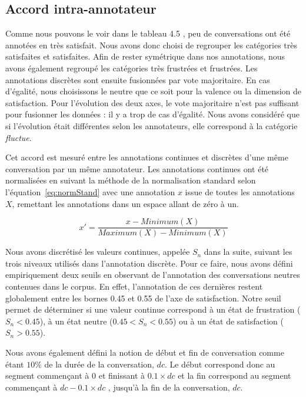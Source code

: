 \subsection{Accord intra-annotateur}
Comme nous pouvons le voir dans le tableau 4.5
, peu de conversations ont été annotées en très satisfait. Nous avons donc choisi de regrouper les catégories très satisfaites et satisfaites. Afin de rester symétrique dans nos annotations, nous avons également regroupé les catégories très frustrées et frustrées. Les annotations discrètes sont ensuite fusionnées par vote majoritaire. En cas d'égalité,
nous choisissons le neutre que ce soit pour la valence ou la dimension de satisfaction. Pour l'évolution des deux axes, le vote majoritaire n'est pas suffisant pour fusionner les données : il y a trop de cas d'égalité. Nous avons considéré que si l'évolution était différentes selon les annotateurs, elle correspond à la catégorie \textit{fluctue}.

Cet accord est mesuré entre les annotations continues et discrètes d'une même conversation par un même annotateur. Les annotations continues ont été normalisées en suivant la méthode de la normalisation standard selon l'équation~\ref{eq:normStand} avec une annotation $x$ issue de toutes les annotations $X$, remettant les annotations dans un espace allant de zéro à un.

\begin{equation}
  x' = \frac{x-Minimum(X)}{Maximum(X)-Minimum(X)}
  \label{eq:normStand}
\end{equation}

Nous avons discrétisé les valeurs continues, appelée $S_n$ dans la suite, suivant les trois niveaux utilisés dans l'annotation discrète. Pour ce faire, nous avons défini empiriquement deux seuils en observant de l'annotation des conversations neutres contenues dans le corpus. En effet, l'annotation de ces dernières restent globalement entre les bornes 0.45 et 0.55 de l'axe de satisfaction. Notre seuil permet de déterminer si une valeur continue correspond à un état de frustration ($S_n<0.45$), à un état neutre ($0.45 < S_n < 0.55$) ou à un état de satisfaction ($S_n > 0.55$).

Nous avons également défini la notion de début et fin de conversation comme étant $10\%$ de la durée de la conversation, $dc$.
Le début correspond donc au segment commençant à 0 et finissant à $0.1\times dc$ et la fin correspond au segment commençant à $ dc - 0.1\times dc$ , jusqu'à la fin de la conversation, $dc$.

